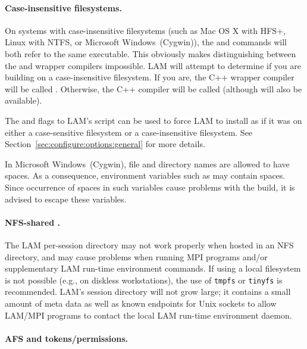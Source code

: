\paragraph{Case-insensitive filesystems.}

On systems with case-insensitive filesystems (such as Mac OS X with
HFS+, Linux with NTFS, or Microsoft Windows\trademark\ (Cygwin)), the
 and  commands will both refer to the same
executable.  This obviously makes distinguishing between the
 and  wrapper compilers impossible.  LAM will
attempt to determine if you are building on a case-insensitive
filesystem.  If you are, the C++ wrapper compiler will be called
.  Otherwise, the C++ compiler will be called 
(although  will also be available).

The  and  flags to LAM's
 script can be used to force LAM to install as if it
was on either a case-sensitive filesystem or a case-insensitive
filesystem.  See Section~\ref{sec:configure:options:general} for more
details.


In Microsoft Windows\trademark\ (Cygwin), file and directory names are
allowed to have spaces.  As a consequence, environment variables such
as  may contain spaces.  Since occurrence of spaces in
such variables cause problems with the build, it is advised to escape
these variables.


\paragraph{NFS-shared .}

The LAM per-session directory may not work properly when hosted in an
NFS directory, and may cause problems when running MPI programs and/or
supplementary LAM run-time environment commands.  If using a local
filesystem is not possible (e.g., on diskless workstations), the use
of {\tt tmpfs} or {\tt tinyfs} is recommended.  LAM's session
directory will not grow large; it contains a small amount of meta data
as well as known endpoints for Unix sockets to allow LAM/MPI programs
to contact the local LAM run-time environment daemon.

\paragraph{AFS and tokens/permissions.}

